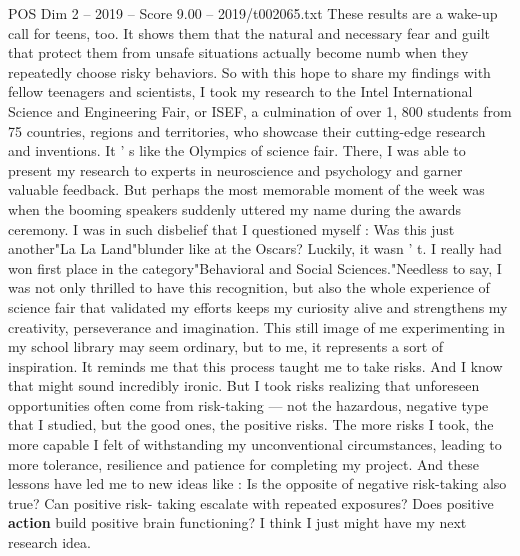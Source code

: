 \begin{textsample}{POS Dim 2 – 2019 – Score 9.00 – 2019/t002065.txt}
These results are a wake-up call for teens, too.
It shows them that the natural and necessary fear and guilt that protect them from unsafe situations actually become numb when they repeatedly choose risky behaviors.
So with this hope to share my findings with fellow teenagers and scientists, I took my research to the Intel International Science and Engineering Fair, or ISEF, a culmination of over 1, 800 students from 75 countries, regions and territories, who showcase their cutting-edge research and inventions.
It ' s like the Olympics of science fair.
There, I was able to present my research to experts in neuroscience and psychology and garner valuable feedback.
But perhaps the most memorable moment of the week was when the booming speakers suddenly uttered my name during the awards ceremony.
I was in such disbelief that I questioned myself : Was this just another"La La Land"blunder like at the Oscars?
Luckily, it wasn ' t.
I really had won first place in the category"Behavioral and Social Sciences."Needless to say, I was not only thrilled to have this recognition, but also the whole experience of science fair that validated my efforts keeps my curiosity alive and strengthens my creativity, perseverance and imagination.
This still image of me experimenting in my school library may seem ordinary, but to me, it represents a sort of inspiration.
It reminds me that this process taught me to take risks.
And I know that might sound incredibly ironic.
But I took risks realizing that unforeseen opportunities often come from risk-taking — not the hazardous, negative type that I studied, but the good ones, the positive risks.
The more risks I took, the more capable I felt of withstanding my unconventional circumstances, leading to more tolerance, resilience and patience for completing my project.
And these lessons have led me to new ideas like : Is the opposite of negative risk-taking also true?
Can positive risk- taking escalate with repeated exposures?
Does positive \textbf{action} build positive brain functioning?
I think I just might have my next research idea.

\end{textsample}
